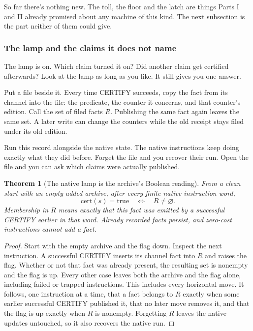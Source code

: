 \documentclass[11pt,twoside]{article}
\theoremstyle{thielethm}
\newtheorem{theorem}{Theorem}[section]
\theoremstyle{thieledef}
\theoremstyle{thieledef}
\theoremstyle{thieledef}
\theoremstyle{thielethm}
\theoremstyle{thieleobs}
\theoremstyle{thielethm}
\begin{document}
So far there's nothing new. The toll, the floor and the latch are things Parts I and II already
promised about any machine of this kind. The next subsection is the part neither of them could give.

\subsubsection*{The lamp and the claims it does not name}

The lamp is on. Which claim turned it on? Did another claim get certified afterwards?
Look at the lamp as long as you like. It still gives you one answer.

Put a file beside it. Every time CERTIFY succeeds, copy the fact from its channel into
the file: the predicate, the counter it concerns, and that counter's edition. Call the
set of filed facts $R$. Publishing the same fact again leaves the same set. A later
write can change the counters while the old receipt stays filed under its old edition.

Run this record alongside the native state. The native instructions keep doing exactly
what they did before. Forget the file and you recover their run. Open the file and you
can ask which claims were actually published.

\begin{theorem}[The native lamp is the archive's Boolean reading]\label{thm:native-archive-lamp}
From a clean start with an empty added archive, after every finite native instruction word,
\[
\mathrm{cert}(s)=\mathrm{true}\quad\Longleftrightarrow\quad R\ne\varnothing.
\]
Membership in $R$ means exactly that this fact was emitted by a successful CERTIFY earlier
in that word. Already recorded facts persist, and zero-cost instructions cannot add a fact.
\end{theorem}
\begin{proof}
Start with the empty archive and the flag down. Inspect the next instruction.
A successful CERTIFY inserts its channel fact into $R$ and raises the flag. Whether
or not that fact was already present, the resulting set is nonempty and the flag is up.
Every other case leaves both the archive and the flag alone, including failed or trapped
instructions. This includes every horizontal move. It follows, one instruction at a
time, that a fact belongs to $R$ exactly when some earlier successful CERTIFY published
it, that no later move removes it, and that the flag is up exactly when $R$ is nonempty.
Forgetting $R$ leaves the native updates untouched, so it also recovers the native run.
\end{proof}
\end{document}
